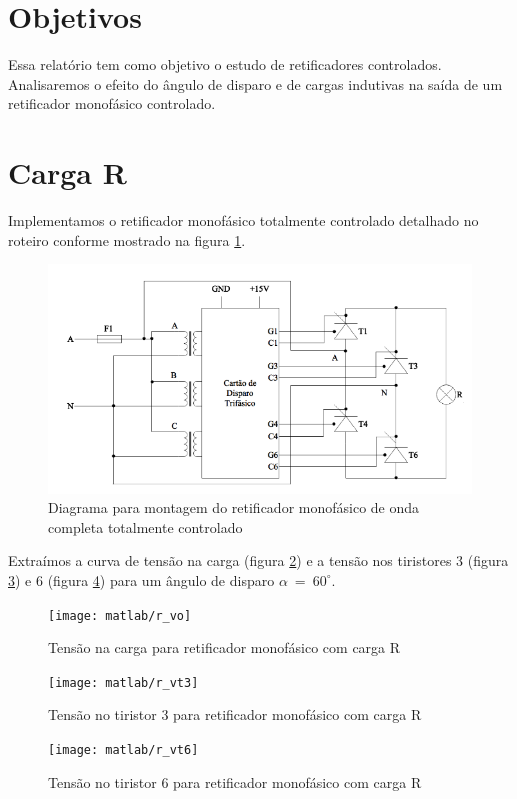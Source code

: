 \documentclass{article}
\begin{document}


\onehalfspacing
\section{Objetivos}
	Essa relatório tem como objetivo o estudo de retificadores controlados. Analisaremos o efeito do ângulo de disparo e de cargas indutivas na saída de um retificador monofásico controlado.
	 
\section{Carga R}
Implementamos o retificador monofásico totalmente controlado detalhado no roteiro conforme mostrado na figura \ref{fig:resq}.
\begin{figure}[H]
	\centering
	\includegraphics[width=\linewidth]{dados/resq}
	\caption{Diagrama para montagem do retificador monofásico de onda completa totalmente controlado}
	\label{fig:resq}
\end{figure}

Extraímos a curva de tensão na carga (figura \ref{fig:rvo}) e a tensão nos tiristores 3 (figura \ref{fig:rvt3}) e 6 (figura \ref{fig:rvt6}) para um ângulo de disparo $\alpha\ =\ 60^\circ$.
\begin{figure}[H]
	\centering
	\texttt{[image: matlab/r\_vo]}
	\caption{Tensão na carga para retificador monofásico com carga R}
	\label{fig:rvo}
\end{figure}
\begin{figure}[H]
	\centering
	\texttt{[image: matlab/r\_vt3]}
	\caption{Tensão no tiristor 3 para retificador monofásico com carga R}
	\label{fig:rvt3}
\end{figure}
\begin{figure}[H]
	\centering
	\texttt{[image: matlab/r\_vt6]}
	\caption{Tensão no tiristor 6 para retificador monofásico com carga R}
	\label{fig:rvt6}
\end{figure}
\end{document}
